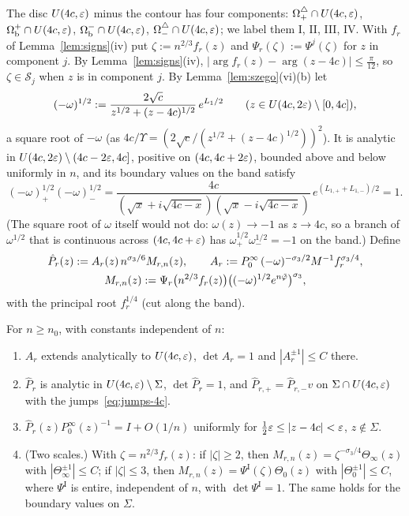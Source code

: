 The disc $U(4c,\varepsilon)$ minus the contour has four components: $\Omega^{\triangle}_+\cap U(4c,\varepsilon)$, $\Omega_{\mathrm{b}}^+\cap U(4c,\varepsilon)$,
$\Omega_{\mathrm{b}}^-\cap U(4c,\varepsilon)$, $\Omega^{\triangle}_-\cap U(4c,\varepsilon)$; we label them I, II, III, IV. With $f_r$ of Lemma~\ref{lem:signs}(iv)
put $\zeta:=n^{2/3}f_r(z)$ and $\Psi_r(\zeta):=\Psi^j(\zeta)$ for $z$ in component $j$. By Lemma~\ref{lem:signs}(iv),
$|\arg f_r(z)-\arg(z-4c)|\le\frac\pi{12}$, so $\zeta\in\mathcal S_j$ when $z$ is in component $j$. By
Lemma~\ref{lem:szego}(vi)(b) let
\begin{equation}\label{eq:omega-root}
  (-\omega)^{1/2}:=\frac{2\sqrt c}{z^{1/2}+(z-4c)^{1/2}}\,e^{L_1/2}\qquad(z\in U(4c,2\varepsilon)\setminus[0,4c]),
\end{equation}
a square root of $-\omega$ (as $4c/\Upsilon=(2\sqrt c/(z^{1/2}+(z-4c)^{1/2}))^2$). It is analytic in
$U(4c,2\varepsilon)\setminus(4c-2\varepsilon,4c]$, positive on $(4c,4c+2\varepsilon)$, bounded above and below uniformly in $n$, and its
boundary values on the band satisfy
\begin{equation}\label{eq:omega-root-band}
  (-\omega)^{1/2}_+(-\omega)^{1/2}_-=\frac{4c}{(\sqrt x+i\sqrt{4c-x})(\sqrt x-i\sqrt{4c-x})}\,e^{(L_{1,+}+L_{1,-})/2}=1 .
\end{equation}
(The square root of $\omega$ itself would not do: $\omega(z)\to-1$ as $z\to4c$, so a branch of $\omega^{1/2}$ that is
continuous across $(4c,4c+\varepsilon)$ has $\omega^{1/2}_+\omega^{1/2}_-=-1$ on the band.) Define
\begin{equation}\label{eq:airy}
\begin{gathered}
  \hat P_r(z):=A_r(z)\,n^{\sigma_3/6}M_{r,n}(z),\qquad A_r:=P^\infty_0\,(-\omega)^{-\sigma_3/2}M^{-1}f_r^{\sigma_3/4},\\
  M_{r,n}(z):=\Psi_r\bigl(n^{2/3}f_r(z)\bigr)\bigl((-\omega)^{1/2}e^{n\tilde\varphi}\bigr)^{\sigma_3},
\end{gathered}
\end{equation}
with the principal root $f_r^{1/4}$ (cut along the band).

\begin{lemma}\label{lem:airy}
For $n\ge n_0$, with constants independent of $n$:
\begin{enumerate}
\item[(i)] $A_r$ extends analytically to $U(4c,\varepsilon)$, $\det A_r=1$ and $|A_r^{\pm1}|\le C$ there.
\item[(ii)] $\hat P_r$ is analytic in $U(4c,\varepsilon)\setminus\Sigma$, $\det\hat P_r=1$, and $\hat P_{r,+}=\hat P_{r,-}v$ on
  $\Sigma\cap U(4c,\varepsilon)$ with the jumps~\eqref{eq:jumps-4c}.
\item[(iii)] $\hat P_r(z)P^\infty_0(z)^{-1}=I+O(1/n)$ uniformly for $\frac12\varepsilon\le|z-4c|<\varepsilon$, $z\notin\Sigma$.
\item[(iv)] (Two scales.) With $\zeta=n^{2/3}f_r(z)$: if $|\zeta|\ge2$, then $M_{r,n}(z)=\zeta^{-\sigma_3/4}\Theta_\infty(z)$ with
  $|\Theta_\infty^{\pm1}|\le C$; if $|\zeta|\le3$, then $M_{r,n}(z)=\Psi^{\mathrm I}(\zeta)\Theta_0(z)$ with $|\Theta_0^{\pm1}|\le C$,
  where $\Psi^{\mathrm I}$ is entire, independent of $n$, with $\det\Psi^{\mathrm I}=1$. The same holds for the boundary values
  on $\Sigma$.
\end{enumerate}
\end{lemma}

